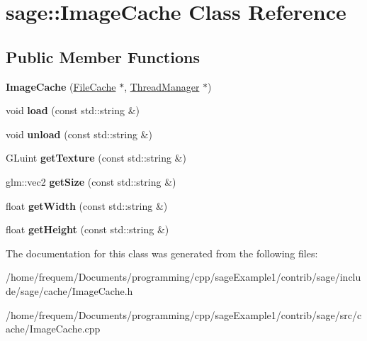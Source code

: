 \hypertarget{classsage_1_1ImageCache}{}\section{sage\+::Image\+Cache Class Reference}
\label{classsage_1_1ImageCache}
\subsection*{Public Member Functions}
\begin{DoxyCompactItemize}
\item 
\mbox{\label{classsage_1_1ImageCache_aa6334522810673df149a290bfbf9da3d}} 
{\bfseries Image\+Cache} (\mbox{\hyperlink{classsage_1_1FileCache}{File\+Cache}} $\ast$, \mbox{\hyperlink{classsage_1_1ThreadManager}{Thread\+Manager}} $\ast$)
\item 
\mbox{\label{classsage_1_1ImageCache_a8dd56015ff31706f4fedc3d3b85510f4}} 
void {\bfseries load} (const std\+::string \&)
\item 
\mbox{\label{classsage_1_1ImageCache_ad97bd335815c57c59af1c9e5d5a2d9db}} 
void {\bfseries unload} (const std\+::string \&)
\item 
\mbox{\label{classsage_1_1ImageCache_a36611ddea849d743f31ad68972946002}} 
G\+Luint {\bfseries get\+Texture} (const std\+::string \&)
\item 
\mbox{\label{classsage_1_1ImageCache_ac81e10d00d95b6d5acdffad8b54bff09}} 
glm\+::vec2 {\bfseries get\+Size} (const std\+::string \&)
\item 
\mbox{\label{classsage_1_1ImageCache_a62e8ffd461f65df1b8e990dd016e6fe4}} 
float {\bfseries get\+Width} (const std\+::string \&)
\item 
\mbox{\label{classsage_1_1ImageCache_ab3fbe32a2cc379e05fb53a9883e20401}} 
float {\bfseries get\+Height} (const std\+::string \&)
\end{DoxyCompactItemize}


The documentation for this class was generated from the following files\+:\begin{DoxyCompactItemize}
\item 
/home/frequem/\+Documents/programming/cpp/sage\+Example1/contrib/sage/include/sage/cache/Image\+Cache.\+h\item 
/home/frequem/\+Documents/programming/cpp/sage\+Example1/contrib/sage/src/cache/Image\+Cache.\+cpp\end{DoxyCompactItemize}
